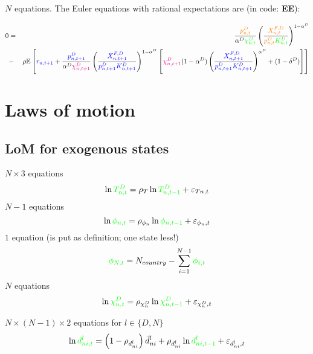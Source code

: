 \documentclass[12pt, bibtotoc, tablecaptionabove, figurecaptionabove, fleqn]{article}
\newcommand{\cl}[1]{{\color{orange}{#1}}}
\newcommand{\st}[1]{{\color{green}{#1}}}
\newcommand{\stnext}[1]{{\color{magenta}{#1}}}
\newcommand{\clnext}[1]{{\color{blue}{#1}}}
\begin{document}
\noindent $N$ equations. The Euler equations with rational expectations are (in code: {\bf{EE}}):

\begin{eqnarray}
	0 &=& \frac{\cl{p_{n, t}^{D}}}{\alpha^D \st{\chi^D_{n, t}}}\left(\frac{\cl{X_{n, t}^{F,D}}}{\cl{p_{n, t}^{D}} \st{K^D_{n, t}}}\right)^{1-\alpha^D} \\
	&-& \rho \mathbb{E}\left[\clnext{r_{n, t+1}} + \frac{\clnext{p_{n, t+1}^{D}}}{\alpha^D \stnext{\chi^D_{n, t+1}}}\left(\frac{\clnext{X_{n, t+1}^{F,D}}}{\clnext{p_{n, t+1}^{D}} \clnext{K^D_{n, t+1}}}\right)^{1-\alpha^D}\left[\stnext{\chi^D_{n, t+1}}(1-\alpha^D)\left(\frac{\clnext{X_{n, t+1}^{F,D}}}{\clnext{p_{n, t+1}^{D}} \clnext{K^D_{n, t+1}}}\right)^{\alpha^D}+(1-\delta^D)\right]\right]\nonumber 
\end{eqnarray}



\section{Laws of motion}

\subsection{LoM for exogenous states}

\noindent $N \times 3$ equations
\begin{equation}
\ln \st{T^D_{n,t}} = \rho_T \ln  \st{T^D_{n,t-1}} + \varepsilon_{Tn,t}    
\end{equation}
\noindent $N-1$ equations
\begin{equation}
\ln \st{\phi_{n,t}} = \rho_{\phi_n} \ln  \st{\phi_{n,t-1}} + \varepsilon_{\phi_n,t}  
\end{equation}
\noindent $1$ equation (is put as definition; one state less!)
\begin{equation}
\st{\phi_{N,t}} = N_{country} - \sum_{i=1}^{N-1} \st{\phi_{i,t}}
\end{equation}
\noindent $N$ equations
\begin{equation}
\ln \st{\chi^D_{n,t}} = \rho_{\chi^D_n} \ln  \st{\chi^D_{n,t-1}} + \varepsilon_{\chi^D_n,t}    
\end{equation}

\noindent $N \times (N-1) \times 2$ equations for $l \in \{D,N\}$
\begin{equation}
\ln \st{d^l_{ni,t}} = \left(1 - \rho_{d^l_{ni}} \right) \bar{d}^l_{ni} + \rho_{d^l_{ni}} \ln  \st{d^l_{ni,t-1}} + \varepsilon_{d^l_{ni},t}    
\end{equation}
\end{document}

